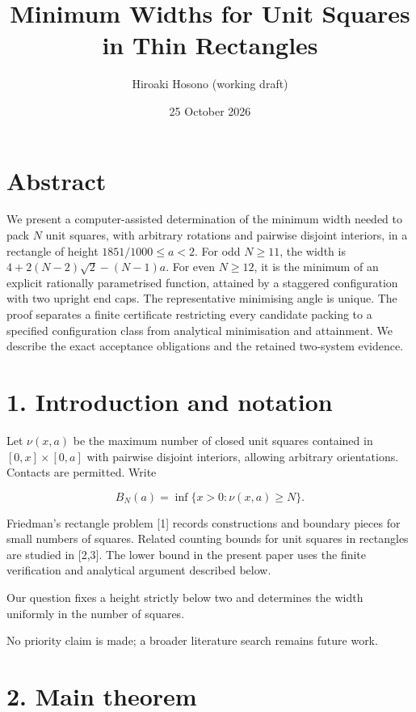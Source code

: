 \documentclass[
  11pt,
  a4paper,
]{article}
\title{Minimum Widths for Unit Squares in Thin Rectangles}
\author{Hiroaki Hosono (working draft)}
\date{25 October 2026}
\begin{document}
\maketitle

\section{Abstract}\label{abstract}

We present a computer-assisted determination of the minimum width needed
to pack \(N\) unit squares, with arbitrary rotations and pairwise
disjoint interiors, in a rectangle of height \(1851/1000\le a<2\). For
odd \(N\ge11\), the width is \(4+2(N-2)\sqrt2-(N-1)a\). For even
\(N\ge12\), it is the minimum of an explicit rationally parametrised
function, attained by a staggered configuration with two upright end
caps. The representative minimising angle is unique. The proof separates
a finite certificate restricting every candidate packing to a specified
configuration class from analytical minimisation and attainment. We
describe the exact acceptance obligations and the retained two-system
evidence.

\section{1. Introduction and notation}\label{introduction-and-notation}

Let \(\nu(x,a)\) be the maximum number of closed unit squares contained
in \([0,x]\times[0,a]\) with pairwise disjoint interiors, allowing
arbitrary orientations. Contacts are permitted. Write

\[
B_N(a)=\inf\{x>0:\nu(x,a)\ge N\}.
\]

Friedman's rectangle problem {[}1{]} records constructions and boundary
pieces for small numbers of squares. Related counting bounds for unit
squares in rectangles are studied in {[}2,3{]}. The lower bound in the
present paper uses the finite verification and analytical argument
described below.

Our question fixes a height strictly below two and determines the width
uniformly in the number of squares.

No priority claim is made; a broader literature search remains future
work.

\section{2. Main theorem}\label{main-theorem}
\end{document}
